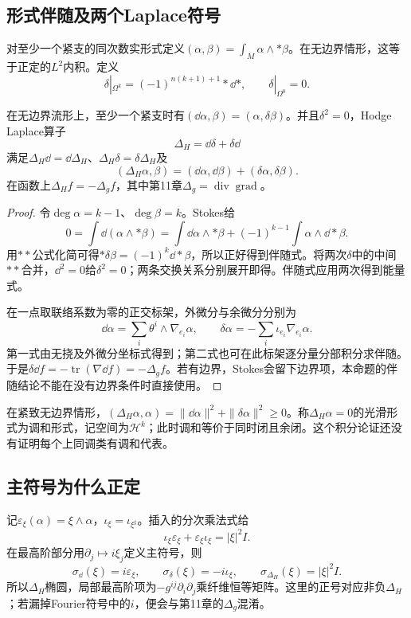 \subsection*{形式伴随及两个Laplace符号}
对至少一个紧支的同次数实形式定义$(\alpha,\beta)=\int_M\alpha\wedge *\beta$。在无边界情形，这等于正定的$L^2$内积。定义
\[
 \delta|_{\Omega^k}=(-1)^{n(k+1)+1}*\dd*,\qquad \delta|_{\Omega^0}=0.
\]
\begin{proposition}[余微分与能量恒等式]\label{prop:codifferential-energy}
在无边界流形上，至少一个紧支时有$(\dd\alpha,\beta)=(\alpha,\delta\beta)$。并且$\delta^2=0$，Hodge Laplace算子
\[
 \Delta_H=\dd\delta+\delta\dd
\]
满足$\Delta_H\dd=\dd\Delta_H$、$\Delta_H\delta=\delta\Delta_H$及
\[
 (\Delta_H\alpha,\beta)=(\dd\alpha,\dd\beta)+(\delta\alpha,\delta\beta).
\]
在函数上$\Delta_Hf=-\Delta_gf$，其中第11章$\Delta_g=\operatorname{div}\operatorname{grad}$。
\end{proposition}
\begin{proof}
令$\deg\alpha=k-1$、$\deg\beta=k$。Stokes给
\[
 0=\int\dd(\alpha\wedge *\beta)
  =\int\dd\alpha\wedge *\beta+(-1)^{k-1}\int\alpha\wedge\dd*\beta.
\]
用$**$公式化简可得$*\delta\beta=(-1)^k\dd*\beta$，所以正好得到伴随式。将两次$\delta$中的中间$**$合并，$\dd^2=0$给$\delta^2=0$；两条交换关系分别展开即得。伴随式应用两次得到能量式。

在一点取联络系数为零的正交标架，外微分与余微分分别为
\[
 \dd\alpha=\sum_i\theta^i\wedge\nabla_{e_i}\alpha,
 \qquad\delta\alpha=-\sum_i\iota_{e_i}\nabla_{e_i}\alpha.
\]
第一式由无挠及外微分坐标式得到；第二式也可在此标架逐分量分部积分求伴随。于是$\delta\dd f=-\operatorname{tr}(\nabla\dd f)=-\Delta_gf$。若有边界，Stokes会留下边界项，本命题的伴随结论不能在没有边界条件时直接使用。
\end{proof}

在紧致无边界情形，$(\Delta_H\alpha,\alpha)=\|\dd\alpha\|^2+\|\delta\alpha\|^2\geq0$。称$\Delta_H\alpha=0$的光滑形式为调和形式，记空间为$\mathcal H^k$；此时调和等价于同时闭且余闭。这个积分论证还没有证明每个上同调类有调和代表。

\subsection*{主符号为什么正定}
记$\varepsilon_\xi(\alpha)=\xi\wedge\alpha$，$\iota_\xi=\iota_{\xi^\sharp}$。插入的分次乘法式给
\[
 \iota_\xi\varepsilon_\xi+\varepsilon_\xi\iota_\xi=|\xi|^2I.
\]
在最高阶部分用$\partial_j\mapsto i\xi_j$定义主符号，则
\[
 \sigma_{\dd}(\xi)=i\varepsilon_\xi,\qquad
 \sigma_\delta(\xi)=-i\iota_\xi,\qquad
 \sigma_{\Delta_H}(\xi)=|\xi|^2I.
\]
所以$\Delta_H$椭圆，局部最高阶项为$-g^{ij}\partial_i\partial_j$乘纤维恒等矩阵。这里的正号对应非负$\Delta_H$；若漏掉Fourier符号中的$i$，便会与第11章的$\Delta_g$混淆。

